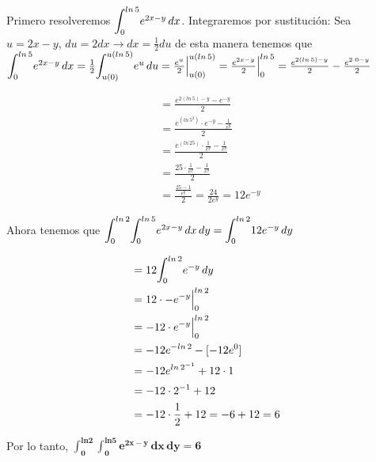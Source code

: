 \documentclass[12pt]{exam}
\begin{document}
\begin{questions}
\begin{enumerate}[a)]
        Primero resolveremos $\mathlarger{\int}_{0}^{ln\,5}e^{2x-y}\,dx$. Integraremos por sustitución: Sea $u = 2x-y$, $du = 2dx \rightarrow dx=\frac{1}{2}du$ de esta manera tenemos que $\mathlarger{\int}_{0}^{ln\,5}e^{2x-y}\,dx =\frac{1}{2}\mathlarger{\int}_{u(0)}^{u(ln\,5)}e^{u}\,du = \frac{e^u}{2} \Big|_{u(0)}^{u(ln\,5)} =   \frac{e^{2x-y}}{2} \Big|_{0}^{ln\,5} =  \frac{e^{2(ln\,5)-y}}{2} -  \frac{e^{2\cdot0-y}}{2}$
         
         \begin{align*}
           &=  \frac{e^{2(ln\,5)-y}-e^{-y}}{2} \\
           &= \frac{e^{(ln\,5^2)}\cdot e^{-y}- \frac{1}{e^y}}{2} \\
           &= \frac{e^{(ln\,25)} \cdot \frac{1}{e^y} - \frac{1}{e^y}} {2} \\
           &= \frac{25 \cdot \frac{1}{e^y} - \frac{1}{e^y}} {2} \\
           &= \frac{ \frac{25-1}{e^y}} {2}  =  \frac{24}{2e^y} =  12e^{-y} 
         \end{align*}


         Ahora tenemos que  $\mathlarger{\int}_{0}^{ln\,2}\mathlarger{\int}_{0}^{ln\,5}e^{2x-y}\,dx\,dy = \mathlarger{\int}_{0}^{ln\,2}12e^{-y}\,dy $

         \begin{align*}
           &=  12 \mathlarger{\int}_{0}^{ln\,2}e^{-y}\,dy \\
           &= 12 \cdot -e^{-y} \Big|_{0}^{ln\,2} \\
           &= -12 \cdot e^{-y} \Big|_{0}^{ln\,2} \\
           &= -12e^{-ln\,2} - [ -12e^{0}] \\
           &= -12e^{ln\,2^{-1}} + 12\cdot 1 \\
           &=-12\cdot 2^{-1} + 12 \\
           &=-12\cdot \frac{1}{2} + 12 =-6+12 = 6   \\
         \end{align*}
         
     \end{enumerate}
     
     Por lo tanto, $\boldsymbol{\int_0^{ln2} \int_0^{ln5} e^{2x-y}\,dx\,dy  = 6}$
     

\end{questions}
\end{document}
